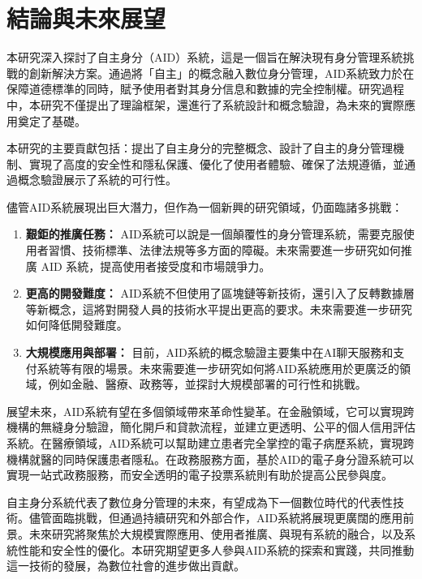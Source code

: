 
\chapter{結論與未來展望}
本研究深入探討了自主身分（AID）系統，這是一個旨在解決現有身分管理系統挑戰的創新解決方案。通過將「自主」的概念融入數位身分管理，AID系統致力於在保障道德標準的同時，賦予使用者對其身分信息和數據的完全控制權。研究過程中，本研究不僅提出了理論框架，還進行了系統設計和概念驗證，為未來的實際應用奠定了基礎。

本研究的主要貢獻包括：提出了自主身分的完整概念、設計了自主的身分管理機制、實現了高度的安全性和隱私保護、優化了使用者體驗、確保了法規遵循，並通過概念驗證展示了系統的可行性。

儘管AID系統展現出巨大潛力，但作為一個新興的研究領域，仍面臨諸多挑戰：
\begin{enumerate}
    \item \textbf{艱鉅的推廣任務：} AID系統可以說是一個顛覆性的身分管理系統，需要克服使用者習慣、技術標準、法律法規等多方面的障礙。未來需要進一步研究如何推廣 AID 系統，提高使用者接受度和市場競爭力。
    \item \textbf{更高的開發難度：} AID系統不但使用了區塊鏈等新技術，還引入了反轉數據層等新概念，這將對開發人員的技術水平提出更高的要求。未來需要進一步研究如何降低開發難度。
    \item \textbf{大規模應用與部署：} 目前，AID系統的概念驗證主要集中在AI聊天服務和支付系統等有限的場景。未來需要進一步研究如何將AID系統應用於更廣泛的領域，例如金融、醫療、政務等，並探討大規模部署的可行性和挑戰。
\end{enumerate}

展望未來，AID系統有望在多個領域帶來革命性變革。在金融領域，它可以實現跨機構的無縫身分驗證，簡化開戶和貸款流程，並建立更透明、公平的個人信用評估系統。在醫療領域，AID系統可以幫助建立患者完全掌控的電子病歷系統，實現跨機構就醫的同時保護患者隱私。在政務服務方面，基於AID的電子身分證系統可以實現一站式政務服務，而安全透明的電子投票系統則有助於提高公民參與度。

自主身分系統代表了數位身分管理的未來，有望成為下一個數位時代的代表性技術。儘管面臨挑戰，但通過持續研究和外部合作，AID系統將展現更廣闊的應用前景。未來研究將聚焦於大規模實際應用、使用者推廣、與現有系統的融合，以及系統性能和安全性的優化。本研究期望更多人參與AID系統的探索和實踐，共同推動這一技術的發展，為數位社會的進步做出貢獻。